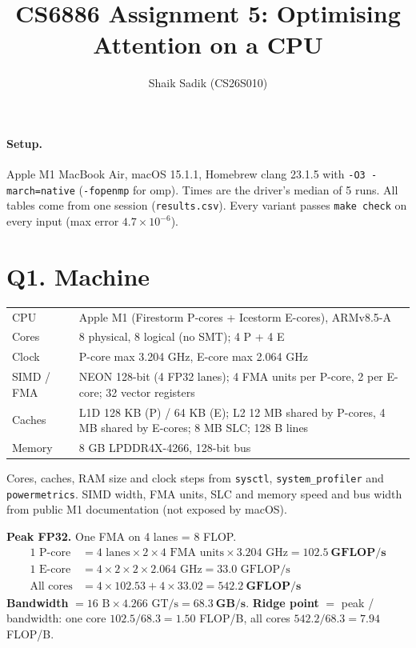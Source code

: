 \documentclass[10pt,a4paper]{article}
\title{\vspace{-1.5cm}CS6886 Assignment 5: Optimising Attention on a CPU}
\author{Shaik Sadik \quad (CS26S010)}
\date{}
\begin{document}
\maketitle
\vspace{-1.2cm}

\paragraph{Setup.} Apple M1 MacBook Air, macOS 15.1.1, Homebrew clang 23.1.5 with \texttt{-O3 -march=native} (\texttt{-fopenmp} for omp). Times are the driver's median of 5 runs. All tables come from one session (\texttt{results.csv}). Every variant passes \texttt{make check} on every input (max error $4.7\times10^{-6}$).

\section*{Q1. Machine}

\noindent\begin{tabularx}{\linewidth}{@{}lX@{}}
\toprule
CPU & Apple M1 (Firestorm P-cores + Icestorm E-cores), ARMv8.5-A \\
Cores & 8 physical, 8 logical (no SMT); 4 P + 4 E \\
Clock & P-core max 3.204 GHz, E-core max 2.064 GHz \\
SIMD / FMA & NEON 128-bit (4 FP32 lanes); 4 FMA units per P-core, 2 per E-core; 32 vector registers \\
Caches & L1D 128 KB (P) / 64 KB (E); L2 12 MB shared by P-cores, 4 MB shared by E-cores; 8 MB SLC; 128 B lines \\
Memory & 8 GB LPDDR4X-4266, 128-bit bus \\
\bottomrule
\end{tabularx}
{\small Cores, caches, RAM size and clock steps from \texttt{sysctl}, \texttt{system\_profiler} and \texttt{powermetrics}. SIMD width, FMA units, SLC and memory speed and bus width from public M1 documentation (not exposed by macOS).}

\textbf{Peak FP32.} One FMA on 4 lanes = 8 FLOP.
\begin{align*}
\text{1 P-core} &= 4 \text{ lanes} \times 2 \times 4 \text{ FMA units} \times 3.204\text{ GHz} = \mathbf{102.5\ GFLOP/s}\\
\text{1 E-core} &= 4 \times 2 \times 2 \times 2.064\text{ GHz} = 33.0\text{ GFLOP/s}\\
\text{All cores} &= 4 \times 102.53 + 4 \times 33.02 = \mathbf{542.2\ GFLOP/s}
\end{align*}
\textbf{Bandwidth} $= 16\text{ B} \times 4.266\text{ GT/s} = \mathbf{68.3\ GB/s}$.\quad
\textbf{Ridge point} $=$ peak / bandwidth: one core $102.5/68.3 = \mathbf{1.50}$ FLOP/B, all cores $542.2/68.3 = \mathbf{7.94}$ FLOP/B.
\end{document}

